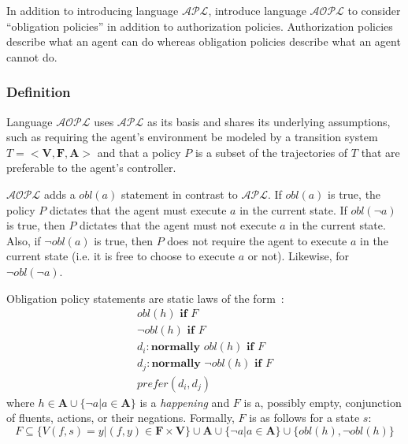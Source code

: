 In addition to introducing language $\mathcal{APL}$, \citet{gelfond_authorization_2008} introduce language $\mathcal{AOPL}$ to consider ``obligation policies'' in addition to authorization policies.
Authorization policies describe what an agent can do whereas obligation policies describe what an agent cannot do.

\subsubsection{Definition}

Language $\mathcal{AOPL}$ uses $\mathcal{APL}$ as its basis and shares its underlying assumptions, such as requiring the agent's environment be modeled by a transition system $T=<\boldsymbol{V}, \boldsymbol{F}, \boldsymbol{A}>$ and that a policy $P$ is a subset of the trajectories of $T$ that are preferable to the agent's controller.

$\mathcal{AOPL}$ adds a $obl(a)$ statement in contrast to $\mathcal{APL}$.
If $obl(a)$ is true, the policy $P$ dictates that the agent must execute $a$ in the current state.
If $obl(\neg a)$ is true, then $P$ dictates that the agent must not execute $a$ in the current state.
Also, if $\neg obl(a)$ is true, then $P$ does not require the agent to execute $a$ in the current state (i.e. it is free to choose to execute $a$ or not).
Likewise, for $\neg obl(\neg a)$.

\begin{definition}
    Obligation policy statements are static laws of the form~\citep{gelfond_authorization_2008}:
    \begin{gather}
        obl\left(h\right) \textbf{ if } F \\
        \neg obl\left(h\right) \textbf{ if } F \\
        d_i: \textbf{normally } obl(h) \textbf{ if } F \\
        d_j: \textbf{normally } \neg obl(h) \textbf{ if } F \\
        prefer(d_i, d_j)
    \end{gather}
    where $h \in \boldsymbol{A} \cup \{\neg a | a \in \boldsymbol{A}\}$ is a \textit{happening} and $F$ is a, possibly empty, conjunction of fluents, actions, or their negations.
    Formally, $F$ is as follows for a state $s$:
    \begin{equation}
        F\subseteq\{V(f,s)=y | (f, y) \in \boldsymbol{F} \times \boldsymbol{V}\} \cup \boldsymbol{A} \cup \{\neg a | a \in \boldsymbol{A}\} \cup \{obl(h), \neg obl(h)\}
    \end{equation}
\end{definition}

